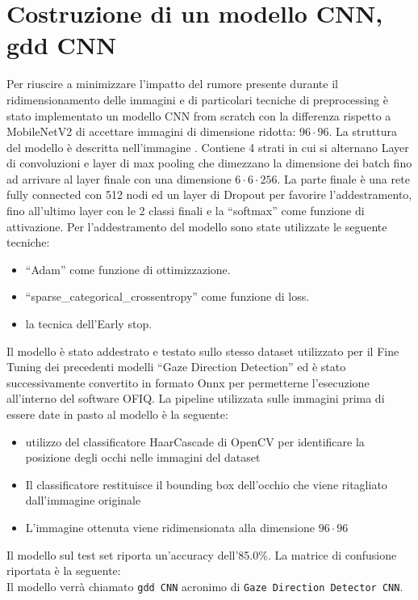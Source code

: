 \documentclass[12pt,a4paper,openright,twoside]{book}
\begin{document}
\section{Costruzione di un modello CNN, gdd CNN}
\label{chap:build_cnn_model}
Per riuscire a minimizzare l'impatto del rumore presente durante il ridimensionamento delle immagini e di particolari tecniche di preprocessing è stato implementato un modello CNN from scratch con la differenza rispetto a MobileNetV2 di accettare immagini di dimensione ridotta: \(96 \cdot 96\).
La struttura del modello è descritta nell'immagine .
Contiene 4 strati in cui si alternano Layer di convoluzioni e layer di max pooling che dimezzano la dimensione dei batch fino ad arrivare al layer finale con una dimensione \(6 \cdot 6 \cdot 256\). La parte finale è una rete fully connected con 512 nodi ed un layer di Dropout per favorire l'addestramento, fino all'ultimo layer con le 2 classi finali e la ``softmax'' come funzione di attivazione.
Per l'addestramento del modello sono state utilizzate le seguente tecniche: \begin{itemize}
    \item ``Adam'' come funzione di ottimizzazione.
    \item ``sparse\_categorical\_crossentropy'' come funzione di loss.
    \item la tecnica dell'Early stop.
\end{itemize} 
Il modello è stato addestrato e testato sullo stesso dataset utilizzato per il Fine Tuning dei precedenti modelli ``Gaze Direction Detection'' ed è stato successivamente convertito in formato Onnx per permetterne l'esecuzione all'interno del software OFIQ.
La pipeline utilizzata sulle immagini prima di essere date in pasto al modello è la seguente: \begin{itemize}
    \item utilizzo del classificatore HaarCascade di OpenCV per identificare la posizione degli occhi nelle immagini del dataset
    \item Il classificatore restituisce il bounding box dell'occhio che viene ritagliato dall'immagine originale
    \item L'immagine ottenuta viene ridimensionata alla dimensione \(96 \cdot 96\)
\end{itemize}
Il modello sul test set riporta un'accuracy dell'85.0\%.
La matrice di confusione riportata è la seguente:  \\
Il modello verrà chiamato \texttt{gdd CNN} acronimo di \texttt{Gaze Direction Detector CNN}.
\end{document}
